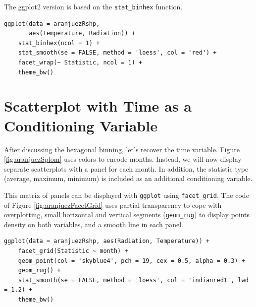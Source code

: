 The ggplot2 version is based on the \texttt{stat\_binhex} function.
\lstset{language=r,label= ,caption= ,captionpos=b,numbers=none}
\begin{lstlisting}
ggplot(data = aranjuezRshp,
       aes(Temperature, Radiation)) +
    stat_binhex(ncol = 1) + 
    stat_smooth(se = FALSE, method = 'loess', col = 'red') +
    facet_wrap(~ Statistic, ncol = 1) +
    theme_bw()
\end{lstlisting}

\section{Scatterplot with Time as a Conditioning Variable \label{SEC:conditionVariable}}
\label{sec:orgc5550a4}

After discussing the hexagonal binning, let's recover the time
variable. Figure \ref{fig:aranjuezSplom} uses colors to encode
months. Instead, we will now display separate scatterplots with a
panel for each month. In addition, the statistic type (average,
maximum, minimum) is included as an additional conditioning variable.

This matrix of panels can be displayed with \texttt{ggplot} using
\texttt{facet\_grid}. The code of Figure \ref{fig:aranjuezFacetGrid} uses partial
transparency to cope with overplotting, small horizontal and vertical
segments (\texttt{geom\_rug}) to display points density on both variables, and
a smooth line in each panel.
\lstset{language=r,label= ,caption= ,captionpos=b,numbers=none}
\begin{lstlisting}
ggplot(data = aranjuezRshp, aes(Radiation, Temperature)) +
    facet_grid(Statistic ~ month) +
    geom_point(col = 'skyblue4', pch = 19, cex = 0.5, alpha = 0.3) +
    geom_rug() +
    stat_smooth(se = FALSE, method = 'loess', col = 'indianred1', lwd = 1.2) +
    theme_bw()
\end{lstlisting}

